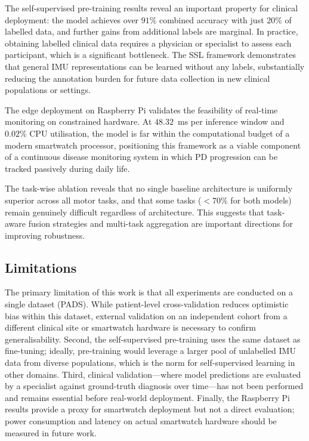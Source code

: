 \documentclass[pmlr]{jmlr}
\begin{document}
The self-supervised pre-training results reveal an important property
for clinical deployment: the model achieves over $91\%$ combined
accuracy with just $20\%$ of labelled data, and further gains from
additional labels are marginal. In practice, obtaining labelled
clinical data requires a physician or specialist to assess each
participant, which is a significant bottleneck. The SSL framework
demonstrates that general IMU representations can be learned without
any labels, substantially reducing the annotation burden for future
data collection in new clinical populations or settings.

The edge deployment on Raspberry Pi validates the feasibility of
real-time monitoring on constrained hardware. At $48.32$~ms per
inference window and $0.02\%$ CPU utilisation, the model is far within
the computational budget of a modern smartwatch processor, positioning
this framework as a viable component of a continuous disease monitoring
system in which PD progression can be tracked passively during daily
life.

The task-wise ablation reveals that no single baseline architecture is
uniformly superior across all motor tasks, and that some tasks
($<70\%$ for both models) remain genuinely difficult regardless of
architecture. This suggests that task-aware fusion strategies and
multi-task aggregation are important directions for improving
robustness.

\subsection{Limitations}

The primary limitation of this work is that all experiments are
conducted on a single dataset (PADS). While patient-level
cross-validation reduces optimistic bias within this dataset, external
validation on an independent cohort from a different clinical site
or smartwatch hardware is necessary to confirm generalisability.
Second, the self-supervised pre-training uses the same dataset as
fine-tuning; ideally, pre-training would leverage a larger pool of
unlabelled IMU data from diverse populations, which is the norm for
self-supervised learning in other domains. Third, clinical
validation---where model predictions are evaluated by a specialist
against ground-truth diagnosis over time---has not been performed and
remains essential before real-world deployment. Finally, the
Raspberry Pi results provide a proxy for smartwatch deployment but
not a direct evaluation; power consumption and latency on actual
smartwatch hardware should be measured in future work.
\end{document}
